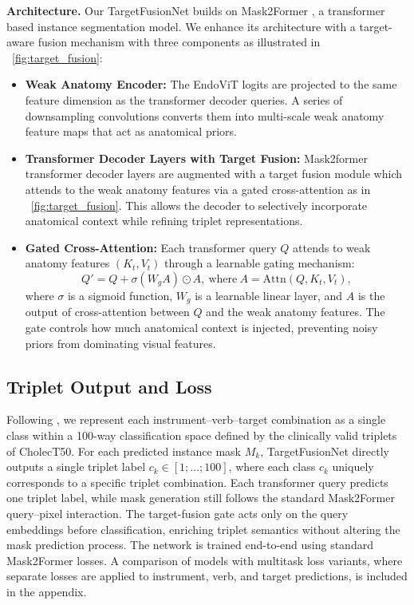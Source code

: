 \documentclass[pdflatex,sn-mathphys-num]{sn-jnl}%
\newcommand{\anatprior}{weak anatomy\xspace}
\newcommand{\AnatPrior}{Weak Anatomy\xspace}
\newcommand{\figref}[1]{\figurename~\ref{#1}}
\theoremstyle{thmstyleone}%
\theoremstyle{thmstyletwo}%
\theoremstyle{thmstylethree}%
\begin{document}
\noindent\textbf{Architecture.} 
Our TargetFusionNet builds on Mask2Former \cite{cheng2022masked_tfn}, a transformer based instance segmentation model. 
We enhance its architecture with a target-aware fusion mechanism with three components as illustrated in \figref{fig:target_fusion}:
%
\begin{itemize}
    \item \textbf{\AnatPrior Encoder:} The EndoViT logits are projected to the same feature dimension as the transformer decoder queries. A series of downsampling convolutions converts them into multi-scale \anatprior feature maps that act as anatomical priors.
    
    \item \textbf{Transformer Decoder Layers with Target Fusion:} Mask2former transformer decoder layers are augmented with a target fusion module which attends to the \anatprior features via a gated cross-attention as in \figref{fig:target_fusion}. This allows the decoder to selectively incorporate anatomical context while refining triplet representations.
    
    \item \textbf{Gated Cross-Attention:} Each transformer query \( Q \) attends to \anatprior features \( (K_t, V_t) \) through a learnable gating mechanism:
    \[
    Q' = Q + \sigma(W_g A) \odot A,
    ~ \mathrm{where} ~  A = \mathrm{Attn}(Q, K_t, V_t),
    \]
    where \( \sigma \) is a sigmoid function, \( W_g \) is a learnable linear layer, and \( A \) is the output of cross-attention between \( Q \) and the \anatprior features. The gate controls how much anatomical context is injected, preventing noisy priors from dominating visual features.

\end{itemize}
%



\subsection{Triplet Output and Loss}
Following \citet{nwoye2022rendezvous}, we represent each instrument–verb–target combination as a single class within a 100-way classification space defined by the clinically valid triplets of CholecT50.
For each predicted instance mask $M_k$, TargetFusionNet directly outputs a single triplet label $c_k \in {[1; \dots; 100]}$, where each class $c_k$ uniquely corresponds to a specific triplet combination. 
Each transformer query predicts one triplet label, while mask generation still follows the standard Mask2Former query–pixel interaction. The target-fusion gate acts only on the query embeddings before classification, enriching triplet semantics without altering the mask prediction process.
The network is trained end-to-end using standard Mask2Former losses. A comparison  of models with multitask loss variants, where separate losses are applied to instrument, verb, and target predictions,  is included in the appendix.
\end{document}

